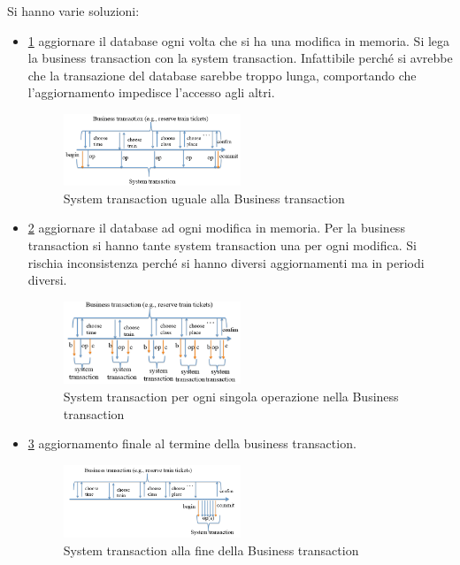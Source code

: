 Si hanno varie soluzioni:
\begin{itemize}
      \item \ref{fig:bt-uguale-st} aggiornare il database ogni volta che si ha
            una modifica in memoria. Si lega la business transaction con la
            system transaction. Infattibile perché si avrebbe che la transazione
            del database sarebbe troppo lunga, comportando che l'aggiornamento
            impedisce l'accesso agli altri.
            \begin{figure}[!ht]
                  \centering
                  \includegraphics[width=0.5\textwidth]{img/mvc/bt-uguale-st.png}
                  \caption{System transaction uguale alla Business transaction}
                  \label{fig:bt-uguale-st}
            \end{figure}
      \item \ref{fig:op-uguale-st} aggiornare il database ad ogni modifica in
            memoria. Per la business transaction si hanno tante system transaction
            una per ogni modifica. Si rischia inconsistenza perché si hanno
            diversi aggiornamenti ma in periodi diversi.
            \begin{figure}[!ht]
                  \centering
                  \includegraphics[width=0.5\textwidth]{img/mvc/op-uguale-st.png}
                  \caption{System transaction per ogni singola operazione nella
                        Business transaction}
                  \label{fig:op-uguale-st}
            \end{figure}
      \item \ref{fig:bt-uguale-st1} aggiornamento finale al termine della business
            transaction.
            \begin{figure}[!ht]
                  \centering
                  \includegraphics[width=0.5\textwidth]{img/mvc/st-finale.png}
                  \caption{System transaction alla fine della Business transaction}
                  \label{fig:bt-uguale-st1}
            \end{figure}
\end{itemize}
